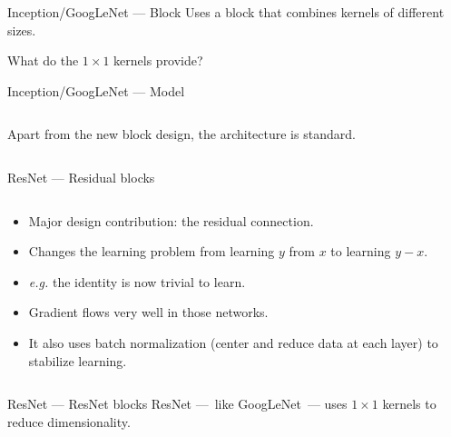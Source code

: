 \begin{frame}{Inception/GoogLeNet --- Block}
  Uses a block that combines kernels of different sizes.


  What do the $1 \times 1$ kernels provide?
\end{frame}

\begin{frame}{Inception/GoogLeNet --- Model}
  \begin{columns}
    \begin{column}{0.6\textwidth}
      Apart from the new block design, the architecture is standard.
    \end{column}
    \begin{column}{0.4\textwidth}
    \end{column}
  \end{columns}
\end{frame}

\begin{frame}{ResNet --- Residual blocks}
  \begin{columns}
    \begin{column}{0.5\textwidth}
      \begin{itemize}
        \item Major design contribution: the residual connection.
        \item Changes the learning problem from learning $y$ from $x$ to learning $y - x$.
        \item \emph{e.g.} the identity is now trivial to learn.
        \item  Gradient flows very well in those networks.
        \item  It also uses batch normalization (center and reduce data at each layer) to stabilize learning.
      \end{itemize}
    \end{column}
    \begin{column}{0.5\textwidth}
    \end{column}
  \end{columns}
\end{frame}

\begin{frame}{ResNet --- ResNet blocks}
  ResNet ---~like GoogLeNet~--- uses $1 \times 1$ kernels to reduce dimensionality.

\end{frame}

